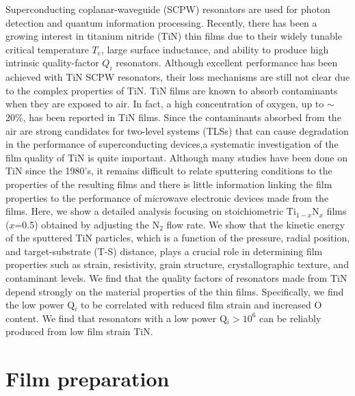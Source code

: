 Superconducting coplanar-waveguide (SCPW) resonators are used for photon detection and quantum information processing. Recently, there has been a growing interest in titanium nitride (TiN) thin films due to their widely tunable critical temperature $T_{\text{c}}$, large surface inductance, and ability to produce high intrinsic quality-factor $Q_{i}$ resonators.\cite{Leduc2010, Vissers2010, Sage2011, Vissers2012, Diener2012, Mazin2012, Cecil2012, Noroozian2012, Calvo2012, Eom2012, Krockenberger2012, Driessen2012} Although excellent performance has been achieved with TiN SCPW resonators, their loss mechanisms are still not clear due to the complex properties of TiN.  TiN films are known to absorb contaminants when they are exposed to air.\cite{Kumar1988, Mandl1990,Logothetidis1999} In fact, a high concentration of oxygen, up to $\sim$20\%, has been reported in TiN films.\cite{Chowdhury1996, Chappe2007, Radecka2011} Since the contaminants absorbed from the air are strong candidates for two-level systems (TLSs) that can cause degradation in the performance of superconducting devices,\cite{Martinis2005}a systematic investigation of the film quality of TiN is quite important. Although many studies have been done on TiN since the 1980's, it remains difficult to relate sputtering conditions to the properties of the resulting films and there is little information linking the film properties to the performance of microwave electronic devices made from the films. Here, we show a detailed analysis focusing on stoichiometric Ti$_{1-x}$N$_{x}$ films ($x$=0.5) obtained by adjusting the N$_{2}$ flow rate.  We show that the kinetic energy of the sputtered TiN particles, which is a function of the pressure, radial position, and target-substrate (T-S) distance, plays a crucial role in determining film properties such as strain, resistivity, grain structure, crystallographic texture, and contaminant levels.  We find that the quality factors of resonators made from TiN depend strongly on the material properties of the thin films.  Specifically, we find the low power Q$_{i}$ to be correlated with reduced film strain and increased O content.  We find that resonators with a low power Q$_{i} > 10^{6}$ can be reliably produced from low film strain TiN.

\section{Film preparation}

